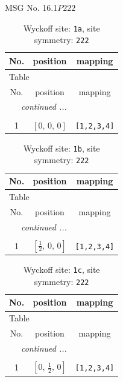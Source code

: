 \documentclass[fleqn,8pt]{jsarticle}
\begin{document}
\setcounter{MaxMatrixCols}{32}

\renewcommand{\tablename}{Table~}
\renewcommand{\figurename}{Figure~}
\begin{center}
\LARGE
MSG No. 16.1\quad$P222$
\end{center}
\renewcommand{\arraystretch}{1.2}
\begin{longtable}{ccc}
\caption{Wyckoff site: {\tt 1a}, site symmetry: {\tt 222}}
 \\
 \hline \hline
No. & position & mapping \\ \hline \endfirsthead

\multicolumn{2}{l}{\tablename\ \thetable{}} \\
 \hline \hline
No. & position & mapping \\ \hline \endhead

 \hline \hline
\multicolumn{2}{r}{\footnotesize\it continued ...} \\ \endfoot

 \hline \hline
\multicolumn{2}{r}{} \\ \endlastfoot

1 & $\left[ 0,\, 0,\, 0 \right]$ & {\tt [1,2,3,4]} \\
\end{longtable}
\renewcommand{\arraystretch}{1.2}
\begin{longtable}{ccc}
\caption{Wyckoff site: {\tt 1b}, site symmetry: {\tt 222}}
 \\
 \hline \hline
No. & position & mapping \\ \hline \endfirsthead

\multicolumn{2}{l}{\tablename\ \thetable{}} \\
 \hline \hline
No. & position & mapping \\ \hline \endhead

 \hline \hline
\multicolumn{2}{r}{\footnotesize\it continued ...} \\ \endfoot

 \hline \hline
\multicolumn{2}{r}{} \\ \endlastfoot

1 & $\left[ \frac{1}{2},\, 0,\, 0 \right]$ & {\tt [1,2,3,4]} \\
\end{longtable}
\renewcommand{\arraystretch}{1.2}
\begin{longtable}{ccc}
\caption{Wyckoff site: {\tt 1c}, site symmetry: {\tt 222}}
 \\
 \hline \hline
No. & position & mapping \\ \hline \endfirsthead

\multicolumn{2}{l}{\tablename\ \thetable{}} \\
 \hline \hline
No. & position & mapping \\ \hline \endhead

 \hline \hline
\multicolumn{2}{r}{\footnotesize\it continued ...} \\ \endfoot

 \hline \hline
\multicolumn{2}{r}{} \\ \endlastfoot

1 & $\left[ 0,\, \frac{1}{2},\, 0 \right]$ & {\tt [1,2,3,4]} \\
\end{longtable}
\end{document}
